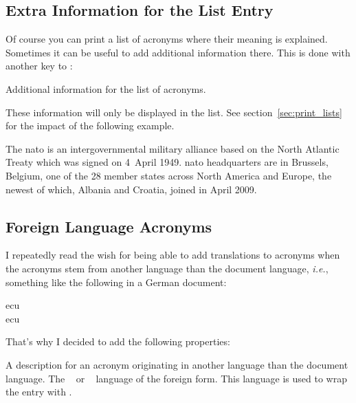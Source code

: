 \documentclass{acro-manual}
\newcommand*\latin[1]{\textit{#1}}
\begin{document}
\subsection{Extra Information for the List Entry}
Of course you can print a list of acronyms where their meaning is explained.
Sometimes it can be useful to add additional information there.  This is done
with another key to :
\begin{properties}
    Additional information for the list of acronyms.
\end{properties}
These information will only be displayed in the list.  See
section~\vref{sec:print_lists} for the impact of the following example.

\begin{example}
  The \ac{nato} is an intergovernmental military alliance based on the
  North Atlantic Treaty which was signed on 4~April 1949. \ac{nato}
  headquarters are in Brussels, Belgium, one of the 28 member states
  across North America and Europe, the newest of which, Albania and
  Croatia, joined in April 2009.
\end{example}

\subsection{Foreign Language Acronyms}\label{ssec:foreign}
I repeatedly read the wish for being able to add translations to acronyms when
the acronyms stem from another language than the document language,
\latin{i.e.}, something like the following in a German document:
\begin{example}
  \ac{ecu}\\
  \ac{ecu}
\end{example}
That's why I decided to add the following properties:
\begin{properties}
    A description for an acronym originating in another language than the
    document language.
    The ~\cite{pkg:babel} or
    ~\cite{pkg:polyglossia} language of the foreign form.
    This language is used to wrap the entry with
    .
\end{properties}
\end{document}
